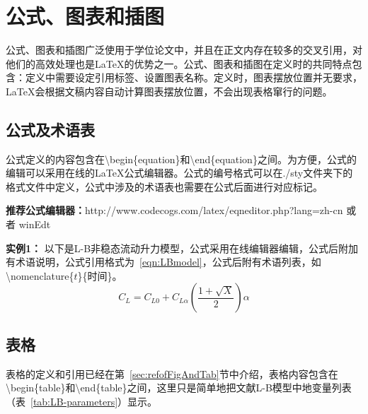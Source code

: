 
\chapter{公式、图表和插图}
\label{chap:eqnFigAndTab}
公式、图表和插图广泛使用于学位论文中，并且在正文内存在较多的交叉引用，对他们的高效处理也是\LaTeX{}的优势之一。公式、图表和插图在定义时的共同特点包含：定义中需要设定引用标签、设置图表名称。定义时，图表摆放位置并无要求，\LaTeX{}会根据文稿内容自动计算图表摆放位置，不会出现表格窜行的问题。

\section{公式及术语表}
\label{sec:eqn}

公式定义的内容包含在\textbackslash begin\{equation\}和\textbackslash end\{equation\}之间。为方便，公式的编辑可以采用在线的\LaTeX{}公式编辑器。公式的编号格式可以在./sty文件夹下的格式文件中定义，公式中涉及的术语表也需要在公式后面进行对应标记。

{\bf{推荐公式编辑器：}}http://www.codecogs.com/latex/eqneditor.php?lang=zh-cn 或者 winEdt

{\bf{实例1：}} 以下是L-B非稳态流动升力模型，公式采用在线编辑器编辑，公式后附加有术语说明，公式引用格式为~\ref{eqn:LBmodel}，公式后附有术语列表，如\textbackslash nomenclature\{$t$\}\{时间\}。
\begin{equation}
 \label{eqn:LBmodel}
   C_{L}=C_{L0}+C_{L\alpha }\left ( \frac{1+\sqrt{X}}{2} \right )\alpha 
\end{equation}
%
%
%
%
%
%
%
%
%

\section{表格}
\label{sec:tab}
表格的定义和引用已经在第~\ref{sec:refofFigAndTab}节中介绍，表格内容包含在\textbackslash begin\{table\}和\textbackslash end\{table\}之间，这里只是简单地把\cite{Pattinson:2013_postall_oscillation}文献L-B模型中地变量列表（表~\ref{tab:LB-parameters}）显示。

